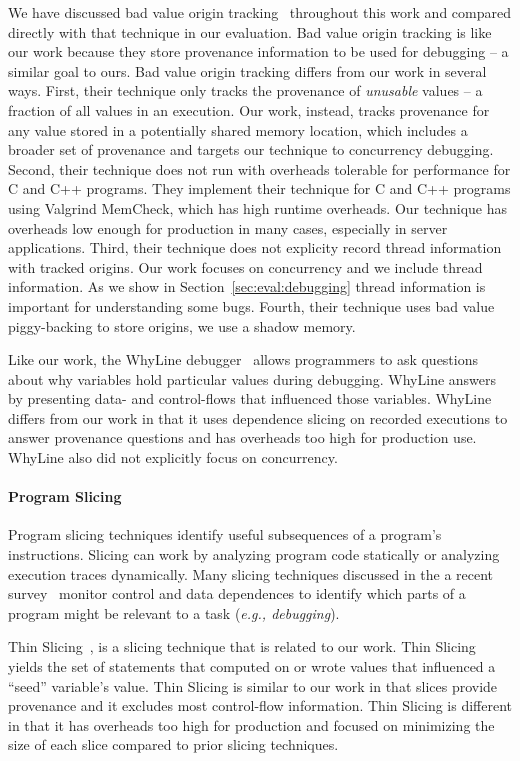 \documentclass[preprint,9pt]{sigplanconf}
\begin{document}
We have discussed bad value origin tracking~\cite{badapples} throughout this
work and compared directly with that technique in our evaluation.  Bad value
origin tracking is like our work because they store provenance information to
be used for debugging -- a similar goal to ours.  Bad value origin tracking
differs from our work in several ways.  First, their technique only tracks the
provenance of {\em unusable} values -- a fraction of all values in an
execution.  Our work, instead, tracks provenance for any value stored in a
potentially shared memory location, which includes a broader set of provenance
and targets our technique to concurrency debugging.  Second, their technique
does not run with overheads tolerable for performance for C and C++ programs.
They implement their technique for C and C++ programs using Valgrind MemCheck,
which has high runtime overheads.  Our technique has overheads low enough for
production in many cases, especially in server applications.  Third, their
technique does not explicity record thread information with tracked origins.
Our work focuses on concurrency and we include thread information.  As we show
in Section~\ref{sec:eval:debugging} thread information is important for
understanding some bugs.  Fourth, their technique uses bad value piggy-backing
to store origins, we use a shadow memory.

Like our work, the WhyLine debugger~\cite{whylineicse, whylinechi} allows
programmers to ask questions about why variables hold particular values during
debugging.  WhyLine answers by presenting data- and control-flows that
influenced those variables.  WhyLine differs from our work in that it uses
dependence slicing on recorded executions to answer provenance questions and
has overheads too high for production use.  WhyLine also did not explicitly
focus on concurrency.


\paragraph{Program Slicing}
Program slicing techniques identify useful subsequences of a program's
instructions.   Slicing can work by analyzing program code statically or
analyzing execution traces dynamically.  Many slicing techniques discussed in
the a recent survey~\cite{tipslicingsurvey} monitor control and data
dependences to identify which parts of a program might be relevant to a task
({\em e.g., debugging}).

Thin Slicing~\cite{thinslicing}, is a slicing technique that is related to our
work.  Thin Slicing yields the set of statements that computed on or wrote
values that influenced a ``seed'' variable's value.  Thin
Slicing is similar to our work in that slices provide provenance and it excludes most
control-flow information.  Thin Slicing is different in that it has
overheads too high for production and focused on minimizing the size of each
slice compared to prior slicing techniques. 
\end{document}
